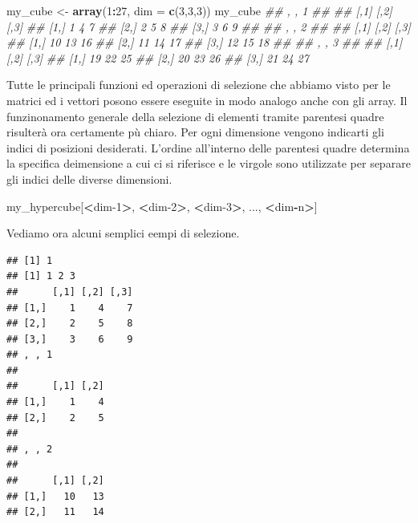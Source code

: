 \documentclass[
]{book}
\newenvironment{Shaded}{\begin{snugshade}}{\end{snugshade}}
\newcommand{\CommentTok}[1]{\textcolor[rgb]{0.56,0.35,0.01}{\textit{#1}}}
\newcommand{\DataTypeTok}[1]{\textcolor[rgb]{0.13,0.29,0.53}{#1}}
\newcommand{\DecValTok}[1]{\textcolor[rgb]{0.00,0.00,0.81}{#1}}
\newcommand{\KeywordTok}[1]{\textcolor[rgb]{0.13,0.29,0.53}{\textbf{#1}}}
\newcommand{\NormalTok}[1]{#1}
\newcommand{\OperatorTok}[1]{\textcolor[rgb]{0.81,0.36,0.00}{\textbf{#1}}}
\newcommand{\StringTok}[1]{\textcolor[rgb]{0.31,0.60,0.02}{#1}}
\begin{document}
\begin{Shaded}
\begin{Highlighting}[]
\NormalTok{my_cube <-}\StringTok{ }\KeywordTok{array}\NormalTok{(}\DecValTok{1}\OperatorTok{:}\DecValTok{27}\NormalTok{, }\DataTypeTok{dim =} \KeywordTok{c}\NormalTok{(}\DecValTok{3}\NormalTok{,}\DecValTok{3}\NormalTok{,}\DecValTok{3}\NormalTok{))}
\NormalTok{my_cube}
\CommentTok{## , , 1}
\CommentTok{## }
\CommentTok{##      [,1] [,2] [,3]}
\CommentTok{## [1,]    1    4    7}
\CommentTok{## [2,]    2    5    8}
\CommentTok{## [3,]    3    6    9}
\CommentTok{## }
\CommentTok{## , , 2}
\CommentTok{## }
\CommentTok{##      [,1] [,2] [,3]}
\CommentTok{## [1,]   10   13   16}
\CommentTok{## [2,]   11   14   17}
\CommentTok{## [3,]   12   15   18}
\CommentTok{## }
\CommentTok{## , , 3}
\CommentTok{## }
\CommentTok{##      [,1] [,2] [,3]}
\CommentTok{## [1,]   19   22   25}
\CommentTok{## [2,]   20   23   26}
\CommentTok{## [3,]   21   24   27}
\end{Highlighting}
\end{Shaded}

Tutte le principali funzioni ed operazioni di selezione che abbiamo visto per le matrici ed i vettori posono essere eseguite in modo analogo anche con gli array. Il funzinonamento generale della selezione di elementi tramite parentesi quadre risulterà ora certamente pù chiaro. Per ogni dimensione vengono indicarti gli indici di posizioni desiderati. L'ordine all'interno delle parentesi quadre determina la specifica deimensione a cui ci si riferisce e le virgole sono utilizzate per separare gli indici delle diverse dimensioni.

\begin{Shaded}
\begin{Highlighting}[]
\NormalTok{my_hypercube[}\OperatorTok{<}\NormalTok{dim}\DecValTok{-1}\OperatorTok{>}\NormalTok{, }\OperatorTok{<}\NormalTok{dim}\DecValTok{-2}\OperatorTok{>}\NormalTok{, }\OperatorTok{<}\NormalTok{dim}\DecValTok{-3}\OperatorTok{>}\NormalTok{, ..., }\OperatorTok{<}\NormalTok{dim}\OperatorTok{-}\NormalTok{n}\OperatorTok{>}\NormalTok{]}
\end{Highlighting}
\end{Shaded}

Vediamo ora alcuni semplici eempi di selezione.

\begin{verbatim}
## [1] 1
## [1] 1 2 3
##      [,1] [,2] [,3]
## [1,]    1    4    7
## [2,]    2    5    8
## [3,]    3    6    9
## , , 1
## 
##      [,1] [,2]
## [1,]    1    4
## [2,]    2    5
## 
## , , 2
## 
##      [,1] [,2]
## [1,]   10   13
## [2,]   11   14
\end{verbatim}
\end{document}
